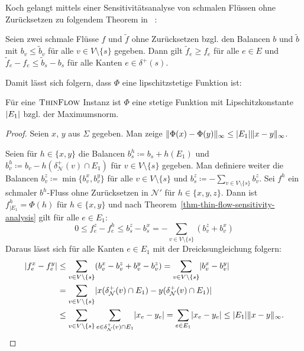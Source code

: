 Koch gelangt mittels einer Sensitivitätsanalyse von schmalen Flüssen ohne Zurück\-setzen zu folgendem Theorem in ~\cite[Theorem 6.53]{Koch2012}:
\begin{theorem}\label{thm-thin-flow-sensitivity-analysis}
	Seien zwei schmale Flüsse $f$ und $\tilde{f}$ ohne Zurücksetzen bzgl. den Balancen $b$ und $\tilde{b}$ mit $b_v \leq \tilde{b}_v$ für alle $v\in V \setminus \{ s \}$ gegeben.
	Dann gilt $\tilde{f}_e \geq f_e$ für alle $e\in E$ und $\tilde{f}_e - f_e \leq \tilde{b}_s - b_s$ für alle Kanten $e\in\delta^+(s)$.
\end{theorem}

Damit lässt sich folgern, dass $\Phi$ eine lipschitzstetige Funktion ist:
\begin{corollary}
	Für eine $\textsc{ThinFlow}$ Instanz ist $\Phi$ eine stetige Funktion mit Lipschitzkonstante $\lvert E_1\rvert$ bzgl. der Maximumsnorm.
\end{corollary}
\begin{proof}
	Seien $x$, $y$ aus $\Sigma$ gegeben.
	Man zeige $ \lVert\Phi(x) - \Phi(y)\rVert_\infty \leq \lvert E_1\rvert \lVert x- y\rVert_\infty $.
	
	Seien für $h\in \{ x,y \}$ die Balancen $b_s^h \coloneq b_s + h(E_1)$ und $b_v^h\coloneq b_v - h(\delta^+_\mathcal{N}(v) \cap E_1)$ für $v\in V\setminus\{ s\}$ gegeben.
	Man definiere weiter die Balancen $b_v^z \coloneq \min \{ b_v^x, b_v^y \}$ für alle $v\in V\setminus \{ s\}$ und $b_s^z\coloneq -\sum_{v\in V\setminus \{ s\}} b_v^z$.
	Sei $f^h$ ein schmaler $b^h$-Fluss ohne Zurücksetzen in $\mathcal{N}'$ für $h\in \{x, y, z\}$.
	Dann ist $f^h_{\mid E_1} = \Phi(h)$ für $h\in \{x,y \}$ und nach Theorem~\ref{thm-thin-flow-sensitivity-analysis} gilt für alle $e\in E_1$:
	\[
		0\leq f_e^z - f_e^h \leq b_s^z - b_s^x = - \sum_{v\in V\setminus\{ s\}} (b_v^z + b_v^x)
	\]
	Daraus lässt sich für alle Kanten $e\in E_1$ mit der Dreicksungleichung folgern:
	\begin{align*}
		\lvert f_e^x - f_e^y\rvert &\leq \sum_{v\in V\setminus\{s \}} (b_v^x - b_v^z + b_v^y - b_v^z) = \sum_{v\in V\setminus\{s\}} \lvert b_v^x - b_v^y\rvert\\
		& = \sum_{v\in V\setminus\{s\}} \lvert x(\delta^+_\mathcal{N}(v) \cap E_1) - y(\delta^+_\mathcal{N}(v) \cap E_1)\rvert \\
		&\leq \sum_{v\in V\setminus\{ s\}} \sum_{e\in\delta^+_\mathcal{N}(v)\cap E_1} \lvert x_e - y_e\rvert = \sum_{e\in E_1} \lvert x_e - y_e\rvert \leq \lvert E_1\rvert \lVert x-y\rVert_\infty.
	\end{align*}
\end{proof}

